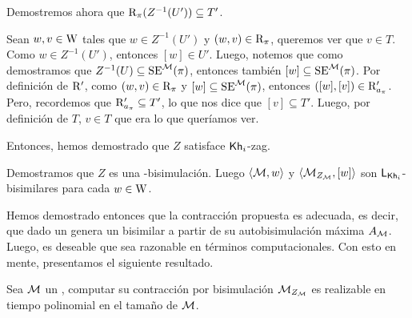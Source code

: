 \begin{demostracion}
\begin{itemize}
        Demostremos ahora que $\mathrm{R}_{\pi}(Z^{-1}(U')) \subseteq T'$. 

        Sean $w, v \in \mathrm{W}$ tales que $w \in Z^{-1}(U')$ y $(w,v) \in \mathrm{R}_\pi$, queremos ver que $v \in T$. 
        Como $w \in Z^{-1}(U')$, entonces $[w] \in U'$. Luego, notemos que como demostramos que 
        $Z^{-1}(U) \subseteq \mathrm{SE}^{\mathcal{M}}(\pi)$, entonces también $[w] \subseteq \mathrm{SE}^{\mathcal{M}}(\pi)$. 
        Por definición de $\mathrm{R}'$, como $(w,v) \in \mathrm{R}_\pi$ y 
        $[w] \subseteq \mathrm{SE}^{\mathcal{M}}(\pi)$, entonces $([w],[v]) \in \mathrm{R}'_{a_\pi}$. Pero, recordemos que 
        $\mathrm{R}'_{a_\pi} \subseteq T'$, lo que nos dice que $[v] \subseteq T'$. Luego, por definición de $T$, $v \in T$ que era lo que 
        queríamos ver.

        Entonces, hemos demostrado que $Z$ satisface $\mathsf{Kh}_i$-zag.
    \end{itemize}
    Demostramos que $Z$ es una \KHilogic-bisimulación. Luego $\langle \mathcal{M},w \rangle$ y $\langle \mathcal{M}_{Z_{\mathcal{M}}},[w] \rangle$ son $\mathsf{L}_{\mathsf{Kh}_i}$-bisimilares para cada $w \in \mathrm{W}$.
\end{demostracion}


Hemos demostrado entonces que la contracción propuesta es adecuada, es decir, que dado un \ults genera un \ults bisimilar a partir de su 
autobisimulación máxima $A_{\mathcal{M}}$. Luego, es deseable que sea razonable en términos computacionales. Con esto en mente, presentamos 
el siguiente resultado.


\begin{teorema}
    Sea $\mathcal{M}$ un \ults, computar su contracción por bisimulación $\mathcal{M}_{Z_{\mathcal{M}}}$ es realizable en tiempo polinomial en el 
    tamaño de $\mathcal{M}$.
\end{teorema}

